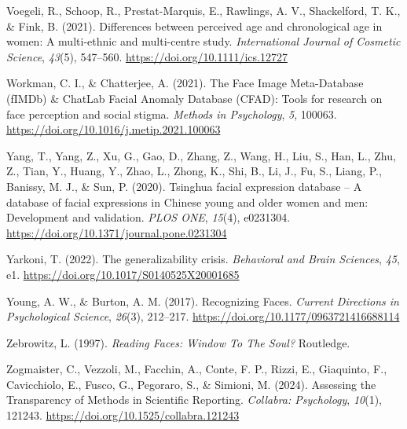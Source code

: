 \documentclass[
  letterpaper,
  DIV=11,
  numbers=noendperiod]{scrartcl}
\newlength{\cslhangindent}
\newenvironment{CSLReferences}[2] %
 {\begin{list}{}{%
  \setlength{\itemindent}{0pt}
  \setlength{\leftmargin}{0pt}
  \setlength{\parsep}{0pt}
  \ifodd #1
   \setlength{\leftmargin}{\cslhangindent}
   \setlength{\itemindent}{-1\cslhangindent}
  \fi
  \setlength{\itemsep}{#2\baselineskip}}}
 {\end{list}}
\begin{document}
\begin{CSLReferences}{1}{0}
Voegeli, R., Schoop, R., Prestat-Marquis, E., Rawlings, A. V.,
Shackelford, T. K., \& Fink, B. (2021). Differences between perceived
age and chronological age in women: {A} multi-ethnic and multi-centre
study. \emph{International Journal of Cosmetic Science}, \emph{43}(5),
547--560. \url{https://doi.org/10.1111/ics.12727}

Workman, C. I., \& Chatterjee, A. (2021). The {Face} {Image}
{Meta}-{Database} ({fIMDb}) \& {ChatLab} {Facial} {Anomaly} {Database}
({CFAD}): {Tools} for research on face perception and social stigma.
\emph{Methods in Psychology}, \emph{5}, 100063.
\url{https://doi.org/10.1016/j.metip.2021.100063}

Yang, T., Yang, Z., Xu, G., Gao, D., Zhang, Z., Wang, H., Liu, S., Han,
L., Zhu, Z., Tian, Y., Huang, Y., Zhao, L., Zhong, K., Shi, B., Li, J.,
Fu, S., Liang, P., Banissy, M. J., \& Sun, P. (2020). Tsinghua facial
expression database -- {A} database of facial expressions in {Chinese}
young and older women and men: {Development} and validation. \emph{PLOS
ONE}, \emph{15}(4), e0231304.
\url{https://doi.org/10.1371/journal.pone.0231304}

Yarkoni, T. (2022). The generalizability crisis. \emph{Behavioral and
Brain Sciences}, \emph{45}, e1.
\url{https://doi.org/10.1017/S0140525X20001685}

Young, A. W., \& Burton, A. M. (2017). Recognizing {Faces}.
\emph{Current Directions in Psychological Science}, \emph{26}(3),
212--217. \url{https://doi.org/10.1177/0963721416688114}

Zebrowitz, L. (1997). \emph{Reading {Faces}: {Window} {To} {The}
{Soul}?} Routledge.

Zogmaister, C., Vezzoli, M., Facchin, A., Conte, F. P., Rizzi, E.,
Giaquinto, F., Cavicchiolo, E., Fusco, G., Pegoraro, S., \& Simioni, M.
(2024). Assessing the {Transparency} of {Methods} in {Scientific}
{Reporting}. \emph{Collabra: Psychology}, \emph{10}(1), 121243.
\url{https://doi.org/10.1525/collabra.121243}

\end{CSLReferences}
\end{document}
